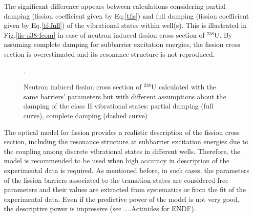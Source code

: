 \documentclass[twocolumn,amsmath,amssymb,10pt,groupedaddress,a4paper]{revtex4}
\begin{document}
 The significant difference appears between calculations considering partial damping (fission
coefficient given by Eq.\ref{tfis}) and full damping (fission coefficient given by
Eq.\ref{tf-full}) of the vibrational states within well(s).
This is illustrated in Fig.\ref{fis-u38-fcom} in case of neutron induced
fission cross section of $^{238}$U. By assuming complete damping for
subbarrier excitation energies, the fission cross section is overestimated and its
resonance structure is not reproduced.
%
\begin{figure}[htbp]
\caption{Neutron induced fission cross section of $^{238}$U calculated with the same
barriers' parameters but with different assumptions about the damping of the class II
vibrational states: partial damping (full curve), complete damping (dashed curve)}.
\end{figure}
%


The optical model for fission provides a realistic description of the fission
cross section, including the resonance structure at subbarrier excitation energies due to the
coupling among discrete vibrational states in different wells. Therefore, the model is recommended to
be used when high accuracy in description of the experimental data is required.
As mentioned before, in such cases,
the parameters of the fission barriers associated to the transition states are considered free
parameters and their values are extracted from systematics or from the fit of the experimental
data. Even if the predictive power of the model is not very good, the descriptive power is
impressive (see ....Actinides for ENDF).


%
\end{document}
